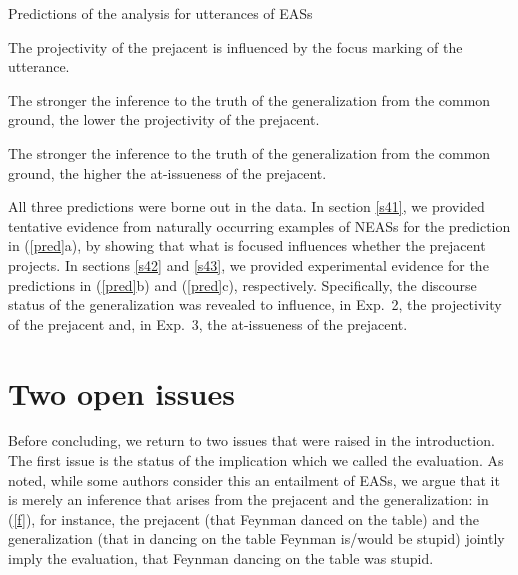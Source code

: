 \documentclass[11pt,fleqn]{article}
\newcommand{\6}{\mbox{$[\hspace*{-.6mm}[$}}
\newcommand{\9}{\mbox{$]\hspace*{-.6mm}]$}}
\begin{document}
\begin{exe}
\exi{(\ref{pred})} Predictions of the analysis for utterances of EASs

\begin{xlist}

\ex The projectivity of the prejacent is influenced by the focus marking of the utterance.

\ex The stronger the inference to the truth of the generalization from the common ground, the lower the projectivity of the prejacent.

\ex The stronger the inference to the truth of the generalization from the common ground, the higher the at-issueness of the prejacent. 

\end{xlist}
\end{exe}
All three predictions were borne out in the data. In section \ref{s41}, we provided tentative evidence from naturally occurring examples of NEASs for the prediction in (\ref{pred}a), by showing that what is focused influences whether the prejacent projects. In sections \ref{s42} and \ref{s43}, we provided experimental evidence for the predictions in (\ref{pred}b) and (\ref{pred}c), respectively. Specifically, the discourse status of the generalization was revealed to influence, in Exp.~2, the projectivity of the prejacent and, in Exp.~3, the at-issueness of the prejacent. 

\section{Two open issues}\label{s5}

Before concluding, we return to two issues that were raised in the introduction. The first issue is the status of the implication which we called the evaluation. As noted, while some authors consider this an entailment of EASs, we argue that it is merely an inference that arises from the prejacent and the generalization: in (\ref{f}), for instance, the prejacent (that Feynman danced on the table) and the generalization (that in dancing on the table Feynman is/would be stupid) jointly imply the evaluation, that Feynman dancing on the table was stupid. 
\end{document}
